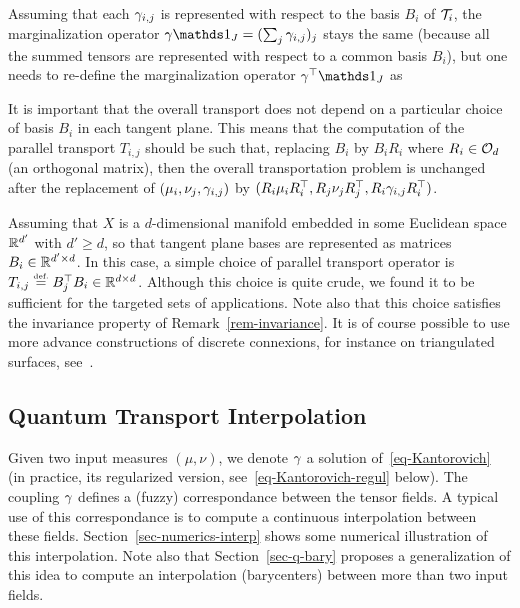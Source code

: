 Assuming that each $\gamma_{i,j}$ is represented with respect to the basis $B_i$ of $\mathcal{T}_i$, the marginalization operator $\ga \ones_J = (\sum_j \ga_{i,j})_j$ stays the same (because all the summed tensors are represented with respect to a common basis $B_i$), but one needs to re-define the marginalization operator $\ga^\top \ones_J$ as


\begin{rem}\label{rem-invariance}
	It is important that the overall transport does not depend on a particular choice of basis $B_i$ in each tangent plane. This means that the computation of the parallel transport $T_{i,j}$ should be such that, replacing $B_i$ by $B_i R_i$ where $R_i \in \mathcal{O}_d$ (an orthogonal matrix), then the overall transportation problem is unchanged after the replacement of $(\mu_i,\nu_j,\gamma_{i,j})$ by $(R_i \mu_i R_i^\top, R_j \nu_j R_j^\top, R_i\gamma_{i,j}R_i^\top)$.
\end{rem}

\begin{rem}
	Assuming that $X$ is a $d$-dimensional manifold embedded in some Euclidean space $\mathbb{R}^{d'}$ with $d' \geq d$, so that tangent plane bases are represented as matrices $B_i \in \mathbb{R}^{d' \times d}$. In this case, a simple choice of parallel transport operator is $T_{i,j} \eqdef B_j^\top B_i \in \RR^{d \times d}$. Although this choice is quite crude, we found it to be sufficient for the targeted sets of applications. Note also that this choice satisfies the invariance property of Remark~\ref{rem-invariance}. It is of course possible to use more advance constructions of discrete connexions, for instance on triangulated surfaces, see~\cite{crane2010trivial,liu2016discrete}.
\end{rem}

\fi

\subsection{Quantum Transport Interpolation}

\newcommand{\muA}{\mu}
\newcommand{\muB}{\nu}


Given two input measures $(\muA,\muB)$, we denote $\gamma$ a solution of~\eqref{eq-Kantorovich} (in practice, its regularized version, see~\eqref{eq-Kantorovich-regul} below). The coupling $\gamma$ defines a (fuzzy) correspondance between the tensor fields. A typical use of this correspondance is to compute a continuous interpolation between these fields. Section~\ref{sec-numerics-interp} shows some numerical illustration of this interpolation. Note also that Section~\ref{sec-q-bary} proposes a generalization of this idea to compute an interpolation (barycenters) between more than two input fields.  


